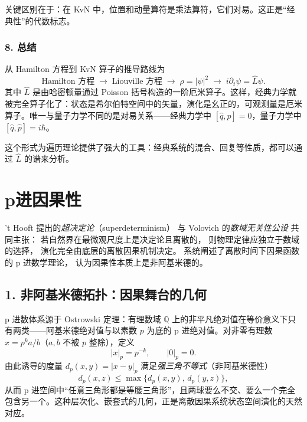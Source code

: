 ﻿\documentclass[10pt,a4paper]{article}
\numberwithin{equation}{section}
\begin{document}
关键区别在于：在 KvN 中，位置和动量算符是乘法算符，它们对易。这正是“经典性”的代数标志。

\subsubsection*{8. 总结}

从 Hamilton 方程到 KvN 算子的推导路线为
\begin{equation*}
    \text{Hamilton 方程}
    \;\longrightarrow\;
    \text{Liouville 方程}
    \;\longrightarrow\;
    \rho=|\psi|^2
    \;\longrightarrow\;
    i\partial_t\psi = \hat L\psi .
\end{equation*}
其中 $\hat L$ 是由哈密顿量通过 Poisson 括号构造的一阶厄米算子。这样，经典力学就被完全算子化了：状态是希尔伯特空间中的矢量，演化是幺正的，可观测量是厄米算子。唯一与量子力学不同的是对易关系——经典力学中 $[\hat q,\hat p]=0$，量子力学中 $[\hat q,\hat p]=i\hbar$。

这个形式为遍历理论提供了强大的工具：经典系统的混合、回复等性质，都可以通过 $\hat L$ 的谱来分析。

\section{p进因果性}

't Hooft 提出的\emph{超决定论}（superdeterminism）
\cite{Hooft2016Cellular}
与 Volovich 的\emph{数域无关性公设}\cite{Volovich1987} 共同主张：
若自然界在最微观尺度上是决定论且离散的，
则物理定律应独立于数域的选择，
演化完全由底层的离散因果机制决定。
\cite{Anashin2025Causality} 系统阐述了离散时间下因果函数的 p 进数学理论，
认为因果性本质上是非阿基米德的\cite{Huang2026HypergraphPadicCausality}。

\subsection*{1. 非阿基米德拓扑：因果舞台的几何}

p 进数体系源于 Ostrowski 定理：有理数域 $\mathbb{Q}$ 上的非平凡绝对值在等价意义下只有两类——阿基米德绝对值与以素数 $p$ 为底的 p 进绝对值。对非零有理数 $x=p^{k}a/b$（$a,b$ 不被 $p$ 整除），定义
\begin{equation}
    |x|_{p}=p^{-k},\qquad |0|_{p}=0 .
\end{equation}
由此诱导的度量 $d_{p}(x,y)=|x-y|_{p}$ 满足\emph{强三角不等式}（非阿基米德性）
\begin{equation}
    d_{p}(x,z)\le \max\{d_{p}(x,y),\,d_{p}(y,z)\},
\end{equation}
从而 p 进空间中“任意三角形都是等腰三角形”，且两球要么不交、要么一个完全包含另一个。这种层次化、嵌套式的几何，正是离散因果系统状态空间演化的天然对应。
\end{document}
